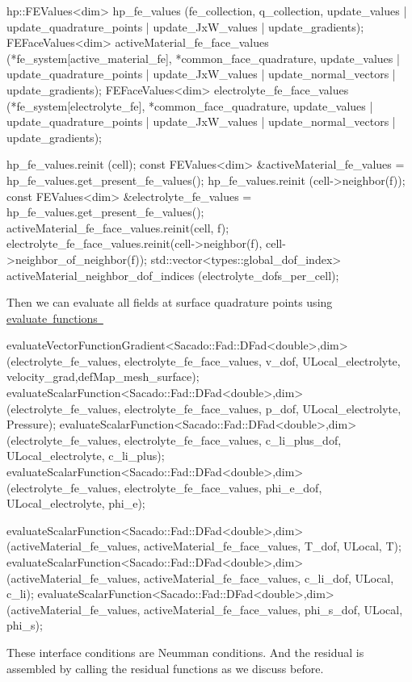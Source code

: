 \begin{DoxyCode}
  hp::FEValues<dim> hp\_fe\_values (fe\_collection, q\_collection, update\_values | update\_quadrature\_points  | 
      update\_JxW\_values | update\_gradients);
FEFaceValues<dim> activeMaterial\_fe\_face\_values (*fe\_system[active\_material\_fe], *common\_face\_quadrature, 
      update\_values | update\_quadrature\_points | update\_JxW\_values | update\_normal\_vectors | update\_gradients);
FEFaceValues<dim> electrolyte\_fe\_face\_values (*fe\_system[electrolyte\_fe], *common\_face\_quadrature, 
      update\_values | update\_quadrature\_points | update\_JxW\_values | update\_normal\_vectors | update\_gradients); 
  
  hp\_fe\_values.reinit (cell);
  \textcolor{keyword}{const} FEValues<dim> &activeMaterial\_fe\_values = hp\_fe\_values.get\_present\_fe\_values();
  hp\_fe\_values.reinit (cell->neighbor(f));
  \textcolor{keyword}{const} FEValues<dim> &electrolyte\_fe\_values = hp\_fe\_values.get\_present\_fe\_values();
  activeMaterial\_fe\_face\_values.reinit(cell, f);
  electrolyte\_fe\_face\_values.reinit(cell->neighbor(f), cell->neighbor\_of\_neighbor(f));
  std::vector<types::global\_dof\_index> activeMaterial\_neighbor\_dof\_indices (electrolyte\_dofs\_per\_cell);
\end{DoxyCode}
 Then we can evaluate all fields at surface quadrature points using \mbox{\hyperlink{group___evaluation_functions_ga2e2fbeb2173113c6889c73bbb7304789}{evaluate functions }} 
\begin{DoxyCode}
evaluateVectorFunctionGradient<Sacado::Fad::DFad<double>,dim>(electrolyte\_fe\_values, 
      electrolyte\_fe\_face\_values, v\_dof, ULocal\_electrolyte, velocity\_grad,defMap\_mesh\_surface);
evaluateScalarFunction<Sacado::Fad::DFad<double>,dim>(electrolyte\_fe\_values, electrolyte\_fe\_face\_values, 
      p\_dof, ULocal\_electrolyte, Pressure);
evaluateScalarFunction<Sacado::Fad::DFad<double>,dim>(electrolyte\_fe\_values, electrolyte\_fe\_face\_values, 
      c\_li\_plus\_dof, ULocal\_electrolyte, c\_li\_plus);
evaluateScalarFunction<Sacado::Fad::DFad<double>,dim>(electrolyte\_fe\_values, electrolyte\_fe\_face\_values, 
      phi\_e\_dof, ULocal\_electrolyte, phi\_e);

evaluateScalarFunction<Sacado::Fad::DFad<double>,dim>(activeMaterial\_fe\_values, 
      activeMaterial\_fe\_face\_values, T\_dof, ULocal, T);
evaluateScalarFunction<Sacado::Fad::DFad<double>,dim>(activeMaterial\_fe\_values, 
      activeMaterial\_fe\_face\_values, c\_li\_dof, ULocal, c\_li);
evaluateScalarFunction<Sacado::Fad::DFad<double>,dim>(activeMaterial\_fe\_values, 
      activeMaterial\_fe\_face\_values, phi\_s\_dof, ULocal, phi\_s);
\end{DoxyCode}
 These interface conditions are Neumman conditions. And the residual is assembled by calling the residual functions as we discuss before.

